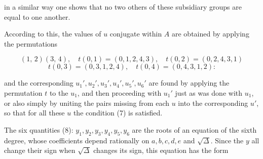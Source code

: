 
in a similar way one shows that no two others of these
subsidiary groups are equal to one another.

According to this, the values of $u$ conjugate within $A$ are
obtained by applying the permutations

\[
(1,\,2)(3,\,4), \quad t(0,1) = (0,1,2,4,3), \quad t(0,2) = (0,2,4,3,1)
\]
\[
t(0,3) = (0,3,1,2,4), \quad t(0,4) = (0,4,3,1,2)\text{:}
\]


and the corresponding $u_1', u_2', u_3', u_4', u_5', u_6'$ are found by
applying the permutation $t$ to the $u_1$, and then proceeding with $u_1'$
just as was done with $u_1$, or also simply by uniting the pairs
missing from each $u$ into the corresponding $u'$,
so that for all these $u$ the condition (7) is satisfied.


The six quantities (8): $y_1, y_2, y_3, y_4, y_5, y_6$ are the roots of an
equation of the sixth degree, whose coefficients depend rationally on $a, b, c, d, e$
and $\sqrt{\varDelta}$. Since the $y$ all change their sign when
$\sqrt{\varDelta}$ changes its sign, this equation has the form

